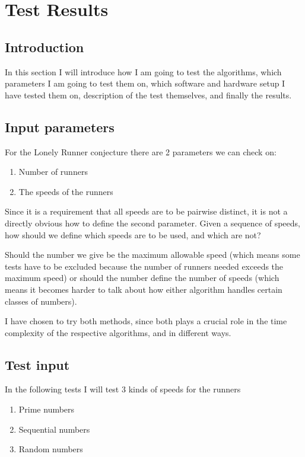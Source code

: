 \section{Test Results}
\label{test}

\subsection{Introduction}
In this section I will introduce how I am going to test the algorithms, which parameters I am going to test them on, which software and hardware setup I have tested them on, description of the test themselves, and finally the results.

\subsection{Input parameters}
For the Lonely Runner conjecture there are 2 parameters we can check
on:
\begin{enumerate}
\item Number of runners
\item The speeds of the runners
\end{enumerate}

Since it is a requirement that all speeds are to be pairwise distinct,
it is not a directly obvious how to define the second
parameter. Given a sequence of speeds, how should we define which
speeds are to be used, and which are not? 

Should the number we give be
the maximum allowable speed (which means some tests have to be
excluded because the number of runners needed exceeds the maximum speed) or
should the number define the number of speeds (which means it becomes
harder to talk about how either algorithm handles certain classes of
numbers).

I have chosen to try both methods, since both plays a crucial role in
the time complexity of the respective algorithms, and in different ways.

\subsection{Test input}
In the following tests I will test 3 kinds of speeds for the runners
\begin{enumerate}
\item Prime numbers
\item Sequential numbers
\item Random numbers
\end{enumerate}

